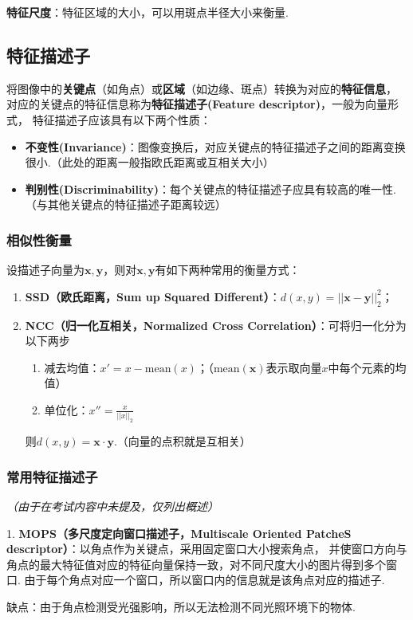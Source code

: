 \documentclass[12pt, a4paper, oneside]{ctexart}
\numberwithin{equation}{section}  %
\theoremstyle{definition}
\def\bd{\boldsymbol}        %
\begin{document}
\textbf{特征尺度}：特征区域的大小，可以用斑点半径大小来衡量.  %
\subsection{特征描述子}
将图像中的\textbf{关键点}（如角点）或\textbf{区域}（如边缘、斑点）转换为对应的\textbf{特征信息}，
对应的关键点的特征信息称为\textbf{特征描述子(Feature descriptor)}，一般为向量形式，
特征描述子应该具有以下两个性质：
\begin{itemize}
    \item \textbf{不变性(Invariance)}：图像变换后，对应关键点的特征描述子之间的距离变换很小.（此处的距离一般指欧氏距离或互相关大小）
    \item \textbf{判别性(Discriminability)}：每个关键点的特征描述子应具有较高的唯一性.（与其他关键点的特征描述子距离较远）
\end{itemize}
\subsubsection{相似性衡量} 设描述子向量为$\bd{x},\bd{y}$，则对$\bd{x},\bd{y}$有如下两种常用的衡量方式：
\begin{enumerate}
    \item \textbf{SSD（欧氏距离，Sum up Squared Different）}：$d(x,y) = ||\bd{x}-\bd{y}||_2^2$；
    \item \textbf{NCC（归一化互相关，Normalized Cross Correlation）}：可将归一化分为以下两步
    \begin{enumerate}
        \item 减去均值：$x' = x-\text{mean}(x)$；（$\text{mean}(\bd{x})$表示取向量$x$中每个元素的均值）
        \item 单位化：$x'' = \frac{x}{||x||_2}$
    \end{enumerate}
    则$d(x,y) = \bd{x}\cdot \bd{y}$.（向量的点积就是互相关）
\end{enumerate}
\subsubsection{常用特征描述子}
\textit{（由于在考试内容中未提及，仅列出概述）}

1. \textbf{MOPS（多尺度定向窗口描述子，Multiscale Oriented PatcheS descriptor）}：以角点作为关键点，采用固定窗口大小搜索角点，
并使窗口方向与角点的最大特征值对应的特征向量保持一致，对不同尺度大小的图片得到多个窗口. 由于每个角点对应一个窗口，所以窗口内的信息就是该角点对应的描述子.

缺点：由于角点检测受光强影响，所以无法检测不同光照环境下的物体.
\end{document}
